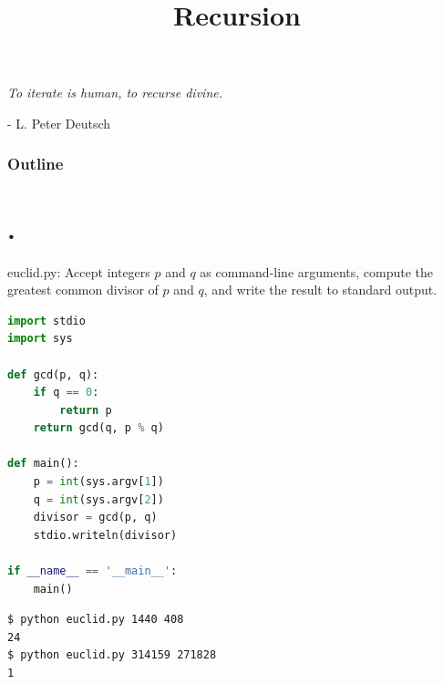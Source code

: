 \documentclass[8pt,a4paper,compress,handout]{beamer}
\title{Recursion}
\date{}
\begin{document}
\begin{frame}
\hfill
\begin{minipage}{150pt}
\begin{flushright}
\tiny \emph{To iterate is human, to recurse divine.}

\smallskip

- L. Peter Deutsch
\end{flushright}
\end{minipage}
\titlepage
\end{frame}

\begin{frame}
\frametitle{Outline}
\tableofcontents
\end{frame}

\section{.}
\begin{frame}[fragile]
\begin{framed}
\tiny euclid.py: Accept integers $p$ and $q$ as command-line arguments, compute the greatest common divisor of $p$ and $q$, and write the result to standard output.
\end{framed}

\begin{lstlisting}[language=Python]
import stdio
import sys

def gcd(p, q):
    if q == 0:
        return p
    return gcd(q, p % q)

def main():
    p = int(sys.argv[1])
    q = int(sys.argv[2])
    divisor = gcd(p, q)
    stdio.writeln(divisor)

if __name__ == '__main__':
    main()
\end{lstlisting}

\begin{lstlisting}[language={}]
$ python euclid.py 1440 408
24
$ python euclid.py 314159 271828
1
\end{lstlisting}
\end{frame}
\end{document}
